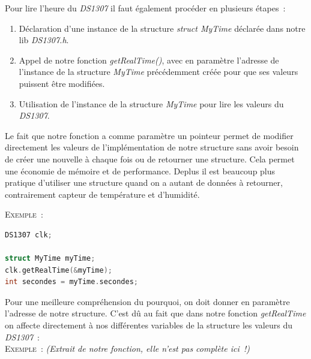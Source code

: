         \vspace{.5 cm}

        \noindent
        Pour lire l'heure du \textit{DS1307} il faut également procéder en plusieurs étapes~:
        \begin{enumerate}
            \item Déclaration d'une instance de la structure \textit{struct MyTime} déclarée dans notre lib \textit{DS1307.h}.
            \item Appel de notre fonction \textit{getRealTime()}, avec en paramètre l'adresse de l'instance de la structure \textit{MyTime} précédemment créée pour que ses valeurs puissent être modifiées.
            \item Utilisation de l'instance de la structure \textit{MyTime} pour lire les valeurs du \textit{DS1307}.
        \end{enumerate}

        \vspace{.2cm}

        \noindent
        Le fait que notre fonction a comme paramètre un pointeur permet de modifier directement les valeurs de l'implémentation de notre structure sans avoir besoin de créer une nouvelle à chaque fois ou de retourner une structure. Cela permet une économie de mémoire et de performance. Deplus il est beaucoup plus pratique d'utiliser une structure quand on a autant de données à retourner, contrairement
        capteur de température et d'humidité.

        \vspace{.5 cm}

        \noindent
        \textsc{Exemple~:}

\begin{lstlisting}[style=myC, caption=Lire l'heure du DS1307, language=C, frame=lines]
DS1307 clk;

struct MyTime myTime;
clk.getRealTime(&myTime);
int secondes = myTime.secondes;
\end{lstlisting}


        \vspace{.5cm}

        Pour une meilleure compréhension du pourquoi, on doit donner en paramètre l'adresse de notre structure. C'est dû au fait que dans notre fonction \textit{getRealTime} on affecte directement à nos différentes variables de la structure les valeurs du \textit{DS1307}~: \\
        
        \noindent
        \textsc{Exemple~:} \textit{(Extrait de notre fonction, elle n'est pas complète ici~!)}

